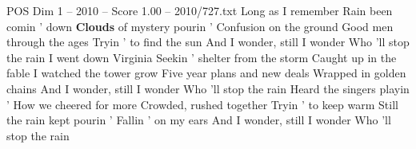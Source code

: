 \begin{textsample}{POS Dim 1 – 2010 – Score 1.00 – 2010/727.txt}  \label{ex:f1_pos_026}
Long as I remember Rain been comin ' down \textbf{Clouds} of mystery pourin ' Confusion on the ground Good men through the ages Tryin ' to find the sun And I wonder, still I wonder Who 'll stop the rain I went down Virginia Seekin ' shelter from the storm Caught up in the fable I watched the tower grow Five year plans and new deals Wrapped in golden chains And I wonder, still I wonder Who 'll stop the rain Heard the singers playin ' How we cheered for more Crowded, rushed together Tryin ' to keep warm Still the rain kept pourin ' Fallin ' on my ears And I wonder, still I wonder Who 'll stop the rain

\end{textsample}
